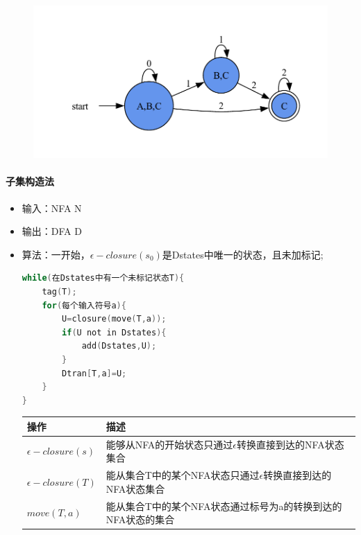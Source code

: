 \documentclass[UTF8]{ctexart} %
\begin{document}
\begin{figure}[H]
    \centering
    \includegraphics[width=\textwidth]{assets/dfa3.pdf}
\end{figure}

\paragraph{子集构造法}

\begin{itemize}
    \item 输入：NFA N
    \item 输出：DFA D
    \item 算法：一开始，$\epsilon-closure(s_0)$是Dstates中唯一的状态，且未加标记;
          \begin{lstlisting}[language=c,style=c]
while(在Dstates中有一个未标记状态T){
    tag(T);
    for(每个输入符号a){
        U=closure(move(T,a));
        if(U not in Dstates){
            add(Dstates,U);
        }
        Dtran[T,a]=U;
    }
}
          \end{lstlisting}
          \begin{table}[H]
              \centering
              \begin{tabular}{|p{3cm}<{\centering}|p{8cm}<{\centering}|}
                  \hline
                  操作                    & 描述                                        \\
                  \hline
                  $\epsilon-closure(s)$ & 能够从NFA的开始状态只通过$\epsilon$转换直接到达的NFA状态集合    \\
                  \hline
                  $\epsilon-closure(T)$ & 能从集合T中的某个NFA状态只通过$\epsilon$转换直接到达的NFA状态集合 \\
                  \hline
                  $move(T,a)$           & 能从集合T中的某个NFA状态通过标号为a的转换到达的NFA状态的集合        \\
                  \hline
              \end{tabular}
          \end{table}
\end{itemize}
\end{document}
